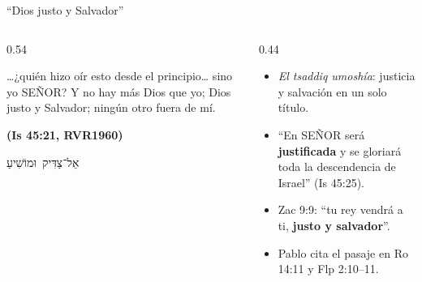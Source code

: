 \documentclass[hyperref={bookmarks=false},aspectratio=169]{beamer}
\newcommand{\heb}[1]{\mbox{\foreignlanguage{hebrew}{#1}}}
\newcommand{\SENOR}{S{\fontsize{0.78em}{1em}\selectfont EÑOR}}
\newcommand{\fuente}[1]{\par\hfill{\upshape\bfseries\footnotesize\textcolor{azul}{#1}}}
\newcommand{\destacar}[1]{\textbf{\textcolor{azul}{#1}}}
\begin{document}
\begin{frame}{``Dios justo y Salvador''}
\begin{columns}[c,onlytextwidth]
\begin{column}{0.54\textwidth}
\begin{cita}\ldots{}¿quién hizo oír esto desde el principio\ldots{} sino yo \SENOR? Y no hay más Dios que yo; Dios justo y Salvador; ningún otro fuera de mí.\fuente{(Is 45:21, RVR1960)}\end{cita}
\begin{center}\heb{אֵל־צַדִּיק וּמוֹשִׁיעַ}\end{center}
\end{column}
\begin{column}{0.44\textwidth}\small
\begin{itemize}
\item \emph{El tsaddiq umoshía}: justicia y salvación en un solo título.
\item ``En \SENOR{} será \destacar{justificada} y se gloriará toda la descendencia de Israel'' (Is 45:25).
\item Zac 9:9: ``tu rey vendrá a ti, \destacar{justo y salvador}''.
\item Pablo cita el pasaje en Ro 14:11 y Flp 2:10--11.
\end{itemize}
\end{column}
\end{columns}
\end{frame}
\end{document}
